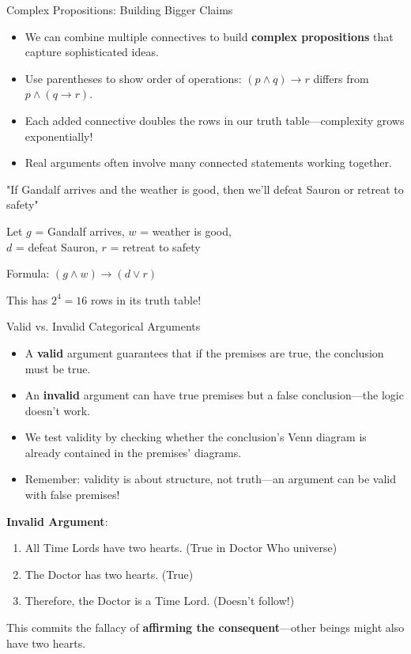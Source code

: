 \documentclass{beamer}
\begin{document}
	\begin{frame}{Complex Propositions: Building Bigger Claims}
		\begin{itemize}
			\item We can combine multiple connectives to build \textbf{complex propositions} that capture sophisticated ideas.
			\item Use parentheses to show order of operations: $(p \wedge q) \rightarrow r$ differs from $p \wedge (q \rightarrow r)$.
			\item Each added connective doubles the rows in our truth table—complexity grows exponentially!
			\item Real arguments often involve many connected statements working together.
		\end{itemize}
		
		\begin{example}
			"If Gandalf arrives and the weather is good, then we'll defeat Sauron or retreat to safety"
			\begin{center}
				Let $g$ = Gandalf arrives, $w$ = weather is good,\\
				$d$ = defeat Sauron, $r$ = retreat to safety
				
				Formula: $(g \wedge w) \rightarrow (d \vee r)$
			\end{center}
			This has $2^4 = 16$ rows in its truth table!
		\end{example}
	\end{frame}
	
	\begin{frame}{Valid vs. Invalid Categorical Arguments}
		\begin{itemize}
			\item A \textbf{valid} argument guarantees that if the premises are true, the conclusion must be true.
			\item An \textbf{invalid} argument can have true premises but a false conclusion—the logic doesn't work.
			\item We test validity by checking whether the conclusion's Venn diagram is already contained in the premises' diagrams.
			\item Remember: validity is about structure, not truth—an argument can be valid with false premises!
		\end{itemize}
		
		\begin{example}
			\textbf{Invalid Argument}:
			\begin{enumerate}
				\item All Time Lords have two hearts. (True in Doctor Who universe)
				\item The Doctor has two hearts. (True)
				\item Therefore, the Doctor is a Time Lord. (Doesn't follow!)
			\end{enumerate}
			This commits the fallacy of \textbf{affirming the consequent}—other beings might also have two hearts.
		\end{example}
	\end{frame}
	
\end{document}
